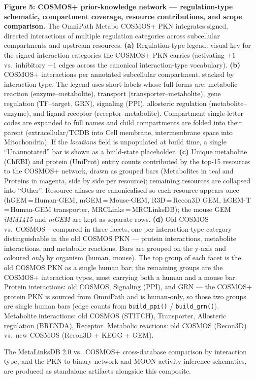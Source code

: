 \textbf{Figure 5: COSMOS+ prior-knowledge network --- regulation-type schematic, compartment coverage, resource contributions, and scope comparison.}
The OmniPath Metabo COSMOS+ PKN integrates signed, directed interactions of multiple regulation categories across subcellular compartments and upstream resources.
\textbf{(a)} Regulation-type legend: visual key for the signed interaction categories the COSMOS+ PKN carries (activating $+1$ vs.\ inhibitory $-1$ edges across the canonical interaction-type vocabulary).
\textbf{(b)} COSMOS+ interactions per annotated subcellular compartment, stacked by interaction type. The legend uses short labels whose full forms are: metabolic reaction (enzyme--metabolite), transport (transporter--metabolite), gene regulation (TF--target, GRN), signaling (PPI), allosteric regulation (metabolite--enzyme), and ligand receptor (receptor--metabolite). Compartment single-letter codes are expanded to full names and child compartments are folded into their parent (extracellular/TCDB into Cell membrane, intermembrane space into Mitochondria). If the \textit{locations} field is unpopulated at build time, a single ``Unannotated'' bar is shown as a build-state placeholder.
\textbf{(c)} Unique metabolite (ChEBI) and protein (UniProt) entity counts contributed by the top-15 resources to the COSMOS+ network, drawn as grouped bars (Metabolites in teal and Proteins in magenta, side by side per resource); remaining resources are collapsed into ``Other''. Resource aliases are canonicalised so each resource appears once (hGEM\,=\,Human-GEM, mGEM\,=\,Mouse-GEM, R3D\,=\,Recon3D GEM, hGEM-T\,=\,Human-GEM transporter, MRCLinks\,=\,MRCLinksDB); the mouse GEM \textit{iMM1415} and \textit{mGEM} are kept as separate rows.
\textbf{(d)} Old COSMOS vs.\ COSMOS+ compared in three facets, one per interaction-type category distinguishable in the old COSMOS PKN --- protein interactions, metabolite interactions, and metabolic reactions. Bars are grouped on the y-axis and coloured \emph{only} by organism (human, mouse). The top group of each facet is the old COSMOS PKN as a single human bar; the remaining groups are the COSMOS+ interaction types, most carrying both a human and a mouse bar. Protein interactions: old COSMOS, Signaling (PPI), and GRN --- the COSMOS+ protein PKN is sourced from OmniPath and is human-only, so those two groups are single human bars (edge counts from \texttt{build\_ppi()} / \texttt{build\_grn()}). Metabolite interactions: old COSMOS (STITCH), Transporter, Allosteric regulation (BRENDA), Receptor. Metabolic reactions: old COSMOS (Recon3D) vs.\ new COSMOS (Recon3D + KEGG + GEM).

\smallskip
\noindent The MetaLinksDB 2.0 vs.\ COSMOS+ cross-database comparison by interaction type, and the PKN-to-binary-network and MOON activity-inference schematics, are produced as standalone artifacts alongside this composite.
